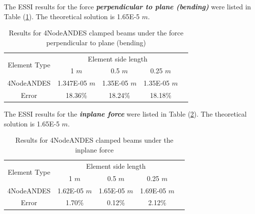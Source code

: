 \documentclass[fleqn,11pt,letter]{article}
\begin{document}
The ESSI results for the force \textbf{\emph{perpendicular to plane (bending)}} were listed in Table (\ref{table Results for 4NodeANDES clamped beams with more elements}).  
The theoretical solution is 1.65E-5 $m$. 

\begin{table}[H]
  \centering
    \caption{Results for 4NodeANDES clamped beams under the force perpendicular to plane (bending)}
  \label{table Results for 4NodeANDES clamped beams with more elements}
  \begin{tabular}{|c|c|c|c|c|}
    \hline 
    \multirow{2}{*}{Element Type} 
       & \multicolumn{3}{|c|}{Element side length} \\ \cline{2-4}
       & 1 $m$ & 0.5 $m$ & 0.25 $m$ \\                              \hline
4NodeANDES & 1.347E-05 $m$ & 1.35E-05  $m$& 1.35E-05 $m$  \\ \hline
Error      & 18.36\%   & 18.24\%  & 18.18\%       \\ \hline
  \end{tabular}
\end{table}

The ESSI results for the \textbf{\emph{inplane force}} were listed in Table (\ref{table Results for 4NodeANDES clamped beams with more elements 2}). 
The theoretical solution is 1.65E-5 $m$. 

\begin{table}[H]
  \centering
      \caption{Results for 4NodeANDES clamped beams under the inplane force}
  \label{table Results for 4NodeANDES clamped beams with more elements 2}
  \begin{tabular}{|c|c|c|c|c|}
    \hline 
    \multirow{2}{*}{Element Type} 
       & \multicolumn{3}{|c|}{Element side length} \\ \cline{2-4}
       & 1 $m$ & 0.5 $m$ & 0.25 $m$ \\                              \hline
4NodeANDES  & 1.62E-05 $m$ & 1.65E-05 $m$ & 1.69E-05 $m$ \\ \hline
Error       & 1.70\%   & 0.12\%   & 2.12\%       \\         \hline
  \end{tabular}
\end{table}

\end{document}
